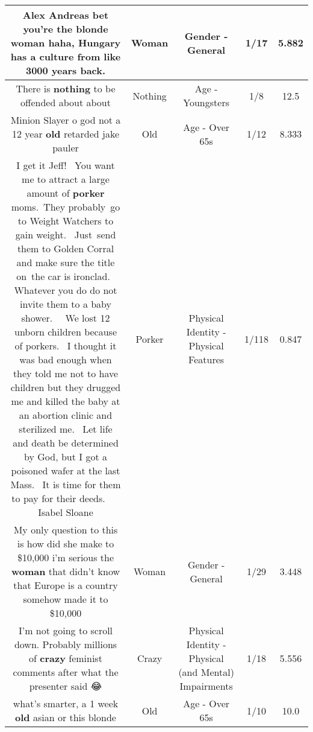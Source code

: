\documentclass[11pt]{article}
\newlength\mylength
\begin{document}
\begin{center}
\begin{longtable}{|C{.65\mylength}|C{.30\mylength}|C{.12\mylength}|C{.12\mylength}|C{.12\mylength}|}
  \small Alex Andreas bet you're the blonde \textbf{woman} haha, Hungary has a culture from like 3000 years back.\normalsize   & Woman & Gender - General & 1/17 & 5.882 \\  \hline
  \small There is \textbf{nothing} to be offended about about\normalsize   & Nothing & Age - Youngsters & 1/8 & 12.5 \\  \hline
  \small Minion Slayer o god not a 12 year \textbf{old} retarded jake pauler\normalsize   & Old & Age - Over 65s & 1/12 & 8.333 \\  \hline
  \small I get it Jeff!  You want me to attract a large amount of \textbf{porker} moms. They probably go to Weight Watchers to gain weight.  Just send them to Golden Corral and make sure the title on the car is ironclad.  Whatever you do do not invite them to a baby shower.   We lost 12 unborn children because of porkers.  I thought it was bad enough when they told me not to have children but they drugged me and killed the baby at an abortion clinic and sterilized me.  Let life and death be determined by God, but I got a poisoned wafer at the last Mass.  It is time for them to pay for their deeds.    Isabel Sloane\normalsize   & Porker & Physical Identity - Physical Features & 1/118 & 0.847 \\  \hline
  \small My only question to this is how did she make to \$10,000 i'm serious the \textbf{woman} that didn't know that Europe is a country somehow made it to \$10,000\normalsize   & Woman & Gender - General & 1/29 & 3.448 \\  \hline
  \small I'm not going to scroll down. Probably millions of \textbf{crazy} feminist comments after what the presenter said 😂\normalsize   & Crazy & Physical Identity - Physical (and Mental) Impairments & 1/18 & 5.556 \\  \hline
  \small what's smarter, a 1 week \textbf{old} asian or this blonde\normalsize   & Old & Age - Over 65s & 1/10 & 10.0 \\  \hline

\end{longtable}
\end{center}
\end{document}
